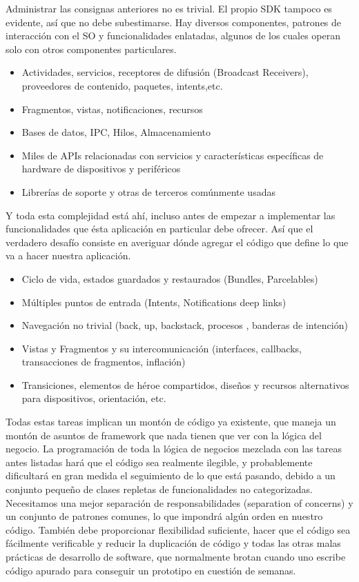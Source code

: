 Administrar las consignas anteriores no es trivial. El propio SDK tampoco es evidente, así que no debe subestimarse. Hay diversos componentes, patrones de interacción con el SO y funcionalidades enlatadas, algunos de los cuales operan solo con otros componentes particulares.

\begin{itemize}
	\item Actividades, servicios, receptores de difusión (Broadcast Receivers), proveedores de contenido, paquetes, intents,etc.
	\item Fragmentos, vistas, notificaciones, recursos
	\item Bases de datos, IPC, Hilos, Almacenamiento
	\item Miles de APIs relacionadas con servicios y características específicas de hardware de dispositivos y periféricos
	\item Librerías de soporte y otras de terceros comúnmente usadas
	
\end{itemize}

Y toda esta complejidad está ahí, incluso antes de empezar a implementar las funcionalidades que ésta aplicación en particular debe ofrecer. Así que el verdadero desafío consiste en averiguar dónde agregar el código que define lo que va a hacer nuestra aplicación.

\begin{itemize}
	\item Ciclo de vida, estados guardados y restaurados (Bundles, Parcelables)
	\item Múltiples puntos de entrada (Intents, Notifications deep links)
	\item Navegación no trivial (back, up, backstack, procesos , banderas de intención)
	\item Vistas y Fragmentos y su intercomunicación (interfaces, callbacks, transacciones de fragmentos, inflación)
	\item Transiciones, elementos de héroe compartidos, diseños y recursos alternativos para dispositivos, orientación, etc.
	
\end{itemize}

Todas estas tareas implican un montón de código ya existente, que maneja un montón de asuntos de framework que nada tienen que ver con la lógica del negocio. La programación de toda la lógica de negocios mezclada con las tareas antes listadas hará que el código sea realmente ilegible, y probablemente dificultará en gran medida el  seguimiento de lo que está pasando, debido a un conjunto pequeño de clases repletas de funcionalidades no categorizadas. Necesitamos una mejor separación de responsabilidades (separation of concerns) y un conjunto de patrones comunes, lo que impondrá algún orden en nuestro código. También debe proporcionar flexibilidad suficiente, hacer que el código sea fácilmente verificable y reducir la duplicación de código y todas las otras malas prácticas de desarrollo de software, que normalmente brotan cuando uno escribe código apurado para conseguir un prototipo en cuestión de semanas.